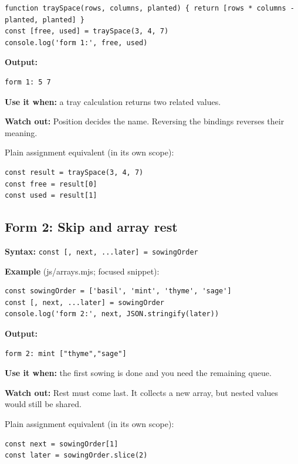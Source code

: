 \documentclass[
  10pt,
  a4paper,
]{article}
\begin{document}
\begin{lstlisting}
function traySpace(rows, columns, planted) { return [rows * columns - planted, planted] }
const [free, used] = traySpace(3, 4, 7)
console.log('form 1:', free, used)
\end{lstlisting}

\textbf{Output:}

\begin{lstlisting}
form 1: 5 7
\end{lstlisting}

\textbf{Use it when:} a tray calculation returns two related values.

\textbf{Watch out:} Position decides the name. Reversing the bindings
reverses their meaning.

Plain assignment equivalent (in its own scope):

\begin{lstlisting}
const result = traySpace(3, 4, 7)
const free = result[0]
const used = result[1]
\end{lstlisting}

\subsection{Form 2: Skip and array
rest}\label{form-2-skip-and-array-rest}

\textbf{Syntax:}
\texttt{const [,\allowbreak{} next,\allowbreak{} .\allowbreak{}.\allowbreak{}.\allowbreak{}later] =\allowbreak{} sowingOrder}

\textbf{Example} (js/arrays.mjs; focused snippet):

\begin{lstlisting}
const sowingOrder = ['basil', 'mint', 'thyme', 'sage']
const [, next, ...later] = sowingOrder
console.log('form 2:', next, JSON.stringify(later))
\end{lstlisting}

\textbf{Output:}

\begin{lstlisting}
form 2: mint ["thyme","sage"]
\end{lstlisting}

\textbf{Use it when:} the first sowing is done and you need the
remaining queue.

\textbf{Watch out:} Rest must come last. It collects a new array, but
nested values would still be shared.

Plain assignment equivalent (in its own scope):

\begin{lstlisting}
const next = sowingOrder[1]
const later = sowingOrder.slice(2)
\end{lstlisting}
\end{document}
